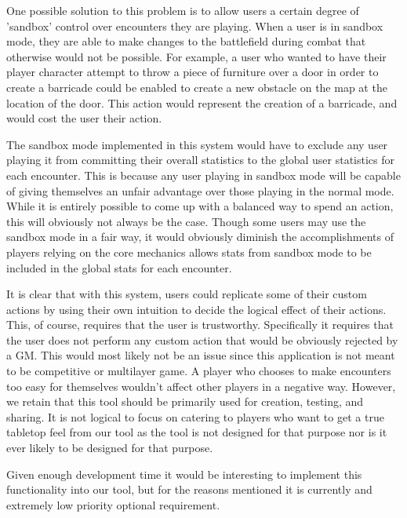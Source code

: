 \documentclass[12pt,a4paper]{report}
\begin{document}
		One possible solution to this problem is to allow users a certain degree of 'sandbox' control over encounters they are playing. When a user is in sandbox mode, they are able to make changes to the battlefield during combat that otherwise would not be possible. For example, a user who wanted to have their player character attempt to throw a piece of furniture over a door in order to create a barricade could be enabled to create a new obstacle on the map at the location of the door. This action would represent the creation of a barricade, and would cost the user their action. 
		
		The sandbox mode implemented in this system would have to exclude any user playing it from committing their overall statistics to the global user statistics for each encounter. This is because any user playing in sandbox mode will be capable of giving themselves an unfair advantage over those playing in the normal mode. While it is entirely possible to come up with a balanced way to spend an action, this will obviously not always be the case. Though some users may use the sandbox mode in a fair way, it would obviously diminish the accomplishments of players relying on the core mechanics allows stats from sandbox mode to be included in the global stats for each encounter.  
		
		It is clear that with this system, users could replicate some of their custom actions by using their own intuition to decide the logical effect of their actions. This, of course, requires that the user is trustworthy. Specifically it requires that the user does not perform any custom action that would be obviously rejected by a GM. This would most likely not be an issue since this application is not meant to be competitive or multilayer game. A player who chooses to make encounters too easy for themselves wouldn't affect other players in a negative way. However, we retain that this tool should be primarily used for creation, testing, and sharing. It is not logical to focus on catering to players who want to get a true tabletop feel from our tool as the tool is not designed for that purpose nor is it ever likely to be designed for that purpose. 
		
		Given enough development time it would be interesting to implement this functionality into our tool, but for the reasons mentioned it is currently and extremely low priority optional requirement. 
		
	\newpage
\end{document}
